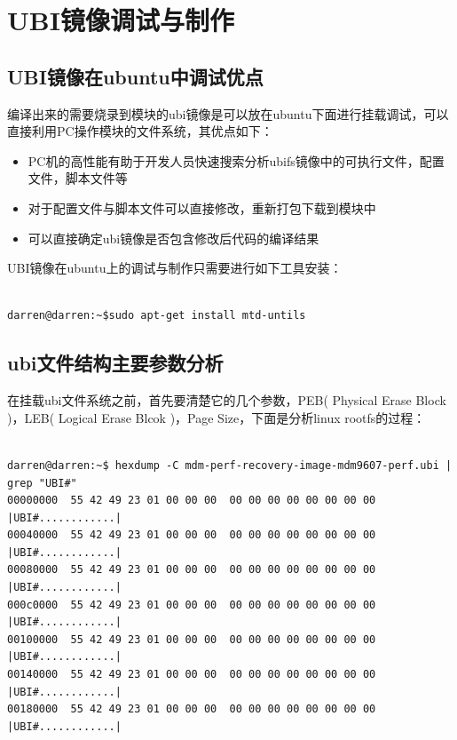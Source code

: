 \chapter{UBI镜像调试与制作}
\section{UBI镜像在ubuntu中调试优点}
编译出来的需要烧录到模块的ubi镜像是可以放在ubuntu下面进行挂载调试，可以直接利用PC操作模块的文件系统，其优点如下：
\begin{itemize}
  \item PC机的高性能有助于开发人员快速搜索分析ubifs镜像中的可执行文件，配置文件，脚本文件等
  \item 对于配置文件与脚本文件可以直接修改，重新打包下载到模块中
  \item 可以直接确定ubi镜像是否包含修改后代码的编译结果
\end{itemize}
UBI镜像在ubuntu上的调试与制作只需要进行如下工具安装：

\begin{mdframed}[backgroundcolor=ubuntured,fontcolor=white,hidealllines=true]
\begin{verbatim}

darren@darren:~$sudo apt-get install mtd-untils

\end{verbatim}
\end{mdframed}

\section{ubi文件结构主要参数分析}
在挂载ubi文件系统之前，首先要清楚它的几个参数，PEB( Physical Erase Block )，LEB( Logical Erase Blcok )，Page Size，下面是分析linux rootfs的过程：
\begin{mdframed}[backgroundcolor=ubuntured,fontcolor=white,hidealllines=true]
\begin{verbatim}

darren@darren:~$ hexdump -C mdm-perf-recovery-image-mdm9607-perf.ubi | grep "UBI#"
00000000  55 42 49 23 01 00 00 00  00 00 00 00 00 00 00 00  |UBI#............|
00040000  55 42 49 23 01 00 00 00  00 00 00 00 00 00 00 00  |UBI#............|
00080000  55 42 49 23 01 00 00 00  00 00 00 00 00 00 00 00  |UBI#............|
000c0000  55 42 49 23 01 00 00 00  00 00 00 00 00 00 00 00  |UBI#............|
00100000  55 42 49 23 01 00 00 00  00 00 00 00 00 00 00 00  |UBI#............|
00140000  55 42 49 23 01 00 00 00  00 00 00 00 00 00 00 00  |UBI#............|
00180000  55 42 49 23 01 00 00 00  00 00 00 00 00 00 00 00  |UBI#............|

\end{verbatim}
\end{mdframed}

